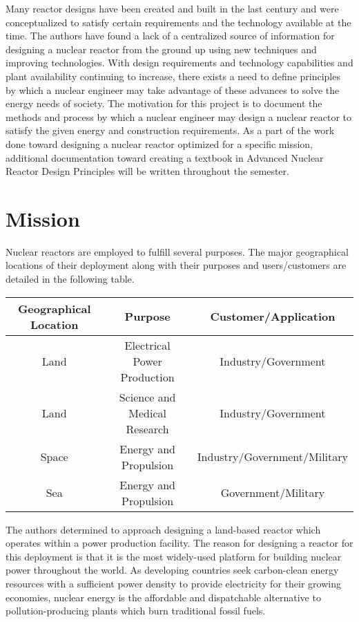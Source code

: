 \documentclass[]{report}
\begin{document}
Many reactor designs have been created and built in the last century and were conceptualized to satisfy certain requirements and the technology available at the time.
The authors have found a lack of a centralized source of information for designing a nuclear reactor from the ground up using new techniques and improving technologies.
With design requirements and technology capabilities and plant availability continuing to increase, there exists a need to define principles by which a nuclear engineer may take advantage of these advances to solve the energy needs of society.
The motivation for this project is to document the methods and process by which a nuclear engineer may design a nuclear reactor to satisfy the given energy and construction requirements.  
As a part of the work done toward designing a nuclear reactor optimized for a specific mission, additional documentation toward creating a textbook in Advanced Nuclear Reactor Design Principles will be written throughout the semester.

\section{Mission}\label{sec:mission}

Nuclear reactors are employed to fulfill several purposes.  The major geographical locations of their deployment along with their purposes and users/customers are detailed in the following table.

\begin{center}
\begin{tabular}[pos{c}]{| c | c | c |}
\hline
Geographical Location & Purpose & Customer/Application \\
\hline
Land & Electrical Power Production & Industry/Government \\
\hline
Land & Science and Medical Research & Industry/Government \\
\hline
Space & Energy and Propulsion & Industry/Government/Military \\
\hline
Sea & Energy and Propulsion & Government/Military \\
\hline
\end{tabular}
\end{center}

The authors determined to approach designing a land-based reactor which operates within a power production facility.
The reason for designing a reactor for this deployment is that it is the most widely-used platform for building nuclear power throughout the world.
As developing countries seek carbon-clean energy resources with a sufficient power density to provide electricity for their growing economies, nuclear energy is the affordable and dispatchable %
alternative to pollution-producing plants which burn traditional fossil fuels.
\end{document}
